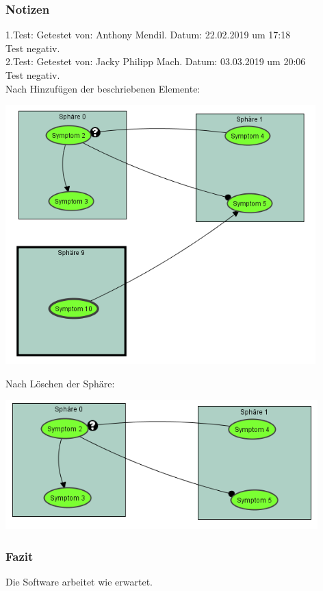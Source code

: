 \documentclass[enabledeprecatedfontcommands]{scrartcl}
\begin{document}
\subsubsection{Notizen}
1.Test: Getestet von: Anthony Mendil. Datum: 22.02.2019 um 17:18 \\
Test negativ. \\
2.Test: Getestet von: Jacky Philipp Mach. Datum: 03.03.2019 um 20:06 \\
Test negativ. \\
\newpage
Nach Hinzufügen der beschriebenen Elemente: 
\begin{center}
\includegraphics[height=10cm]{2_10vorher.PNG}
\end{center}
Nach Löschen der Sphäre: 
\begin{center}
\includegraphics[height=5cm]{2_10nachher.PNG}
\end{center}
\subsubsection{Fazit}
Die Software arbeitet wie erwartet. 
\end{document}
